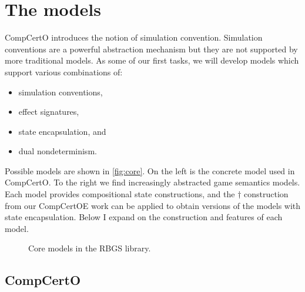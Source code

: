 \documentclass{report}
\begin{document}


\section{The models} %

CompCertO introduces the notion of simulation convention.
Simulation conventions are a powerful abstraction mechanism
but they are not supported by more traditional models.
As some of our first tasks,
we will develop models which support various combinations of:
\begin{itemize}
  \item simulation conventions,
  \item effect signatures,
  \item state encapsulation, and
  \item dual nondeterminism.
\end{itemize}

Possible models are shown in \autoref{fig:core}.
On the left is the concrete model used in CompCertO.
To the right we find increasingly abstracted game semantics models.
Each model provides compositional state constructions, and
the $\dagger$ construction from our CompCertOE work
can be applied to obtain versions of the models with
state encapsulation.
Below I expand on the construction and features of each model.

\begin{figure} %
  \centering
  \caption{Core models in the RBGS library.}
  \label{fig:core}
\end{figure}

\subsection{CompCertO} %
\end{document}
